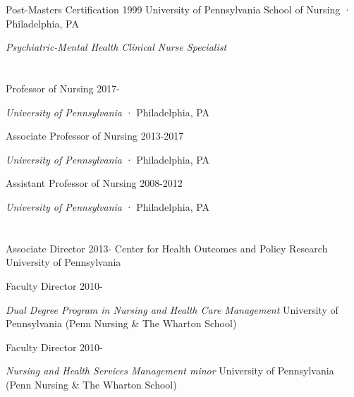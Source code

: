 \documentclass[10pt,]{article}
\begin{document}
{{{{{{{{Post-Masters Certification \hfill 1999 \newline
University of Pennsylvania School of Nursing · Philadelphia, PA  \newline
\hspace*{0.5cm} {\textit {Psychiatric-Mental Health Clinical Nurse Specialist} \newline

\section{\Large {}}

Professor of Nursing \hfill {2017-{\small{}}} \newline
\hspace*{0.5cm} {\textit {University of Pennsylvania} · Philadelphia, PA

Associate Professor of Nursing \hfill 2013-2017 \newline
\hspace*{0.5cm} {\textit {University of Pennsylvania} · Philadelphia, PA

Assistant Professor of Nursing \hfill 2008-2012 \newline
\hspace*{0.5cm} {\textit {University of Pennsylvania} · Philadelphia, PA \newline

\section{\Large {}}

Associate Director  \hfill {2013-{\small{}}} \newline
\hspace*{0.5cm} Center for Health Outcomes and Policy Research \newline
\hspace*{0.5cm} University of Pennsylvania

Faculty Director  \hfill {2010-{\small{}}} \newline
\hspace*{0.5cm} {\textit {Dual Degree Program in Nursing and Health Care Management} \newline
\hspace*{0.5cm} University of Pennsylvania (Penn Nursing \& The Wharton School)

Faculty Director  \hfill {2010-{\small{}}} \newline
\hspace*{0.5cm} {\textit {Nursing and Health Services Management minor} \newline
\hspace*{0.5cm} University of Pennsylvania (Penn Nursing \& The Wharton School) \newline

}}}}}}}}}}}}}}
\end{document}
